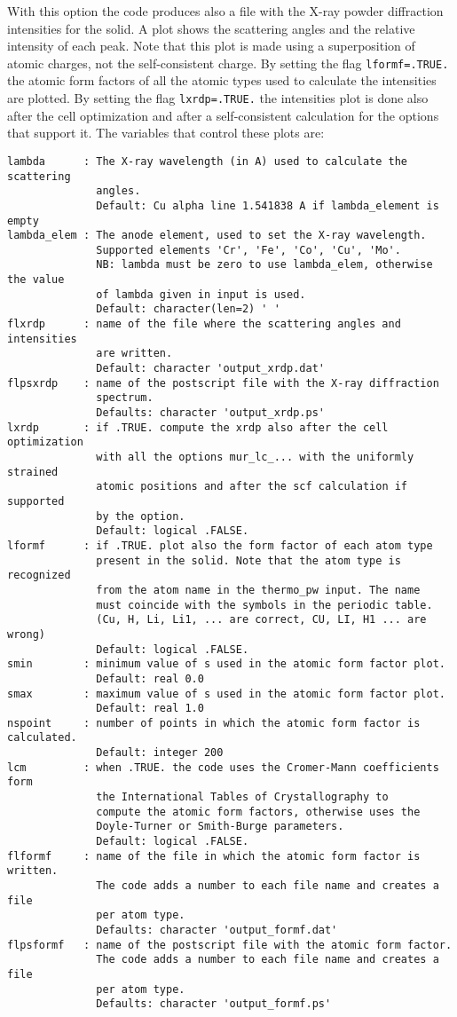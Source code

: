 \documentclass[12pt,a4paper]{article}
\begin{document}
With this option the code produces also a file with the X-ray
powder diffraction intensities for the solid. A plot shows the 
scattering angles and the relative intensity of each peak. Note 
that this plot is made using 
a superposition of atomic charges, not the self-consistent charge.
By setting the flag \texttt{lformf=.TRUE.} the atomic form factors of all 
the atomic types used to calculate the intensities are plotted. 
By setting the flag \texttt{lxrdp=.TRUE.} the intensities plot is done also 
after the cell optimization and after a self-consistent calculation 
for the options that support it.
The variables that control these plots are:
\begin{verbatim}
lambda      : The X-ray wavelength (in A) used to calculate the scattering 
              angles.
              Default: Cu alpha line 1.541838 A if lambda_element is empty
lambda_elem : The anode element, used to set the X-ray wavelength.
              Supported elements 'Cr', 'Fe', 'Co', 'Cu', 'Mo'.
              NB: lambda must be zero to use lambda_elem, otherwise the value
              of lambda given in input is used.
              Default: character(len=2) ' ' 
flxrdp      : name of the file where the scattering angles and intensities 
              are written.
              Default: character 'output_xrdp.dat'
flpsxrdp    : name of the postscript file with the X-ray diffraction
              spectrum.
              Defaults: character 'output_xrdp.ps'
lxrdp       : if .TRUE. compute the xrdp also after the cell optimization
              with all the options mur_lc_... with the uniformly strained
              atomic positions and after the scf calculation if supported
              by the option. 
              Default: logical .FALSE.
lformf      : if .TRUE. plot also the form factor of each atom type
              present in the solid. Note that the atom type is recognized
              from the atom name in the thermo_pw input. The name
              must coincide with the symbols in the periodic table. 
              (Cu, H, Li, Li1, ... are correct, CU, LI, H1 ... are wrong)
              Default: logical .FALSE.
smin        : minimum value of s used in the atomic form factor plot.
              Default: real 0.0
smax        : maximum value of s used in the atomic form factor plot.
              Default: real 1.0
nspoint     : number of points in which the atomic form factor is calculated.
              Default: integer 200
lcm         : when .TRUE. the code uses the Cromer-Mann coefficients form
              the International Tables of Crystallography to
              compute the atomic form factors, otherwise uses the 
              Doyle-Turner or Smith-Burge parameters.
              Default: logical .FALSE.
flformf     : name of the file in which the atomic form factor is written. 
              The code adds a number to each file name and creates a file
              per atom type.
              Defaults: character 'output_formf.dat'
flpsformf   : name of the postscript file with the atomic form factor.  
              The code adds a number to each file name and creates a file
              per atom type.
              Defaults: character 'output_formf.ps'
\end{verbatim}
\end{document}
